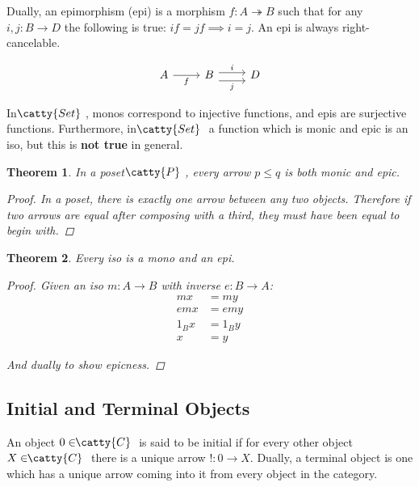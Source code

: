 \documentclass[]{article}
\newtheorem{theorem}{Theorem}
\newcommand{\cdr}[1]{\arrow[swap]{r}{#1}}
\newcommand{\epi}{\twoheadrightarrow}
\newcommand{\tfarr}[4][\to]{\ensuremath{#2 : #3 #1 #4}}
\newcommand{\cat}[1]{\ensuremath{\!\! \catty{#1} \,\,}}
\begin{document}
Dually, an epimorphism (epi) is a morphism \tfarr[\epi]{f}{A}{B} such that for
any \tfarr{i, j}{B}{D} the following is true: $if = jf \implies i = j$. An epi
is always right-cancelable.

$$\begin{tikzcd}
  A \cdr{f} & B \arrow[shift right=2,swap]{r}{j} \arrow[shift left=1]{r}{i} & D
\end{tikzcd}$$

In \cat{Set}, monos correspond to injective functions, and epis are surjective
functions. Furthermore, in \cat{Set} a function which is monic and epic is an
iso, but this is \textbf{not true} in general.

\begin{theorem}
  In a poset \;\cat{P}, every arrow $p \leq q$ is both monic and epic.
  \begin{proof}
    In a poset, there is exactly one arrow between any two objects. Therefore if
    two arrows are equal after composing with a third, they must have been equal
    to begin with.
  \end{proof}
\end{theorem}

\begin{theorem}
  Every iso is a mono and an epi.
  \begin{proof}
    Given an iso \tfarr{m}{A}{B} with inverse \tfarr{e}{B}{A}:
    \begin{align*}
      mx &= my \\
      emx &= emy \\
      1_B x &= 1_B y \\
      x &= y
    \end{align*}

    And dually to show epicness.
  \end{proof}
\end{theorem}

\subsection{Initial and Terminal Objects}

An object $0 \in \cat{C}$ is said to be initial if for every other object $X \in
\cat{C}$ there is a unique arrow \tfarr{!}{0}{X}. Dually, a terminal object is
one which has a unique arrow coming into it from every object in the category.
\end{document}
